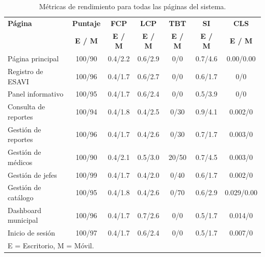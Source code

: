 \begin{table}[H]
\centering
\caption{Métricas de rendimiento para todas las páginas del sistema.}
\label{tab:anexo-rendimiento}
\footnotesize
\begin{tabular}{lcccccc}
\hline
\textbf{Página} & \textbf{Puntaje} & \textbf{FCP} & \textbf{LCP} & \textbf{TBT} & \textbf{SI} & \textbf{CLS} \\
 & \textbf{E / M} & \textbf{E / M} & \textbf{E / M} & \textbf{E / M} & \textbf{E / M} & \textbf{E / M} \\
\hline
Página principal & 100/90 & 0.4/2.2 & 0.6/2.9 & 0/0 & 0.7/4.6 & 0.00/0.00 \\
Registro de ESAVI & 100/96 & 0.4/1.7 & 0.6/2.7 & 0/0 & 0.6/1.7 & 0/0 \\
Panel informativo & 100/95 & 0.4/1.7 & 0.6/2.4 & 0/0 & 0.5/3.9 & 0/0 \\
Consulta de reportes & 100/94 & 0.4/1.8 & 0.4/2.5 & 0/30 & 0.9/4.1 & 0.002/0 \\
Gestión de reportes & 100/96 & 0.4/1.7 & 0.4/2.6 & 0/30 & 0.7/1.7 & 0.003/0 \\
Gestión de médicos & 100/90 & 0.4/2.1 & 0.5/3.0 & 20/50 & 0.7/4.5 & 0.003/0 \\
Gestión de jefes & 100/99 & 0.4/1.7 & 0.4/2.0 & 0/40 & 0.6/1.7 & 0.002/0 \\
Gestión de catálogo & 100/95 & 0.4/1.8 & 0.4/2.6 & 0/70 & 0.6/2.9 & 0.029/0.00 \\
Dashboard municipal & 100/96 & 0.4/1.7 & 0.7/2.6 & 0/0 & 0.5/1.7 & 0.014/0 \\
Inicio de sesión & 100/97 & 0.4/1.7 & 0.6/2.4 & 0/0 & 0.5/1.7 & 0.007/0 \\
\hline
\multicolumn{7}{l}{\footnotesize E = Escritorio, M = Móvil.} \\
\end{tabular}
\end{table}

\renewcommand{\arraystretch}{1}